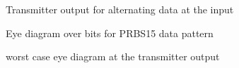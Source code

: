 \begin{figure}[ht]
  \centering
  \caption{Transmitter output for alternating data at the input}
  \label{fig:alternating_data}
\end{figure}

\begin{figure}[ht]
  \centering
  \caption{Eye diagram over \unit[10000]{bits} for PRBS15 data pattern}
  \label{fig:eye_prbs15}
\end{figure}

\begin{figure}[ht]
  \centering
  \caption{worst case eye diagram at the transmitter output}
  \label{fig:wc_eye}
\end{figure}

